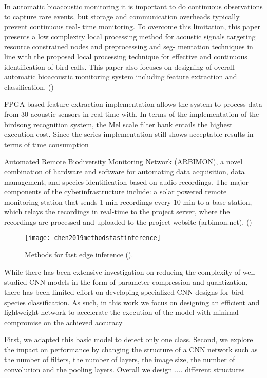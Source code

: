 In automatic bioacoustic monitoring it is important to do continuous observations to capture rare events, but storage and communication overheads typically prevent continuous real- time monitoring. To overcome this limitation, this paper presents a low complexity local processing method for acoustic signals targeting resource constrained nodes and preprocessing and seg- mentation techniques in line with the proposed local processing technique for effective and continuous identification of bird calls. This paper also focuses on designing of overall automatic bioacoustic monitoring system including feature extraction and classification.
(\cite{Weerasena2019})

FPGA-based feature extraction implementation allows the system to process data from 30 acoustic sensors in real time with.
In terms of the implementation of the birdsong recognition system, the Mel scale filter bank entails the highest execution cost. Since the series implementation still shows acceptable results in terms of time consumption %

Automated Remote Biodiversity Monitoring Network (ARBIMON), a novel combination of hardware and software for automating data acquisition, data management, and species identification based on audio recordings. The major components of the cyberinfrastructure include: a solar powered remote monitoring station that sends 1-min recordings every 10 min to a base station, which relays the recordings in real-time to the project server, where the recordings are processed and uploaded to the project website (arbimon.net). (\cite{Aide2013})


\begin{figure}[ht]
\centering
\texttt{[image: chen2019methodsfastinference]}
\caption{Methods for fast edge inference (\cite{Chen2019}).}
\end{figure}

While there has been extensive investigation on reducing the complexity of well studied CNN models in the form of parameter compression and quantization, there has been limited effort on developing specialized CNN designs for bird species classification. 
As such, in this work we focus on designing an efficient and lightweight network to accelerate the execution of the model with minimal compromise on the achieved accuracy

First, we adapted this basic model to detect only one class. Second, we explore the impact on performance by changing the structure of a CNN network such as the number of filters, the number of layers, the image size, the number of convolution and the pooling layers. Overall we design .... different structures



